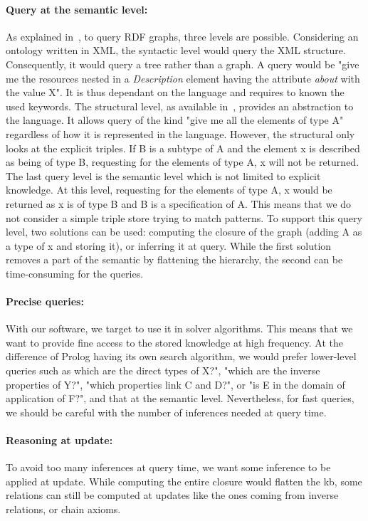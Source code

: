 \paragraph{Query at the semantic level:} As explained in~\cite{broekstra_2002_sesame}, to query RDF graphs, three levels are possible. Considering an ontology written in XML, the syntactic level would query the XML structure. Consequently, it would query a tree rather than a graph. A query would be "give me the resources nested in a \textit{Description} element having the attribute \textit{about} with the value X". It is thus dependant on the language and requires to known the used keywords. The structural level, as available in~\cite{lassila_1998_resource}, provides an abstraction to the language. It allows query of the kind "give me all the elements of type A" regardless of how it is represented in the language. However, the structural only looks at the explicit triples. If B is a subtype of A and the element x is described as being of type B, requesting for the elements of type A, x will not be returned. The last query level is the semantic level which is not limited to explicit knowledge. At this level, requesting for the elements of type A, x would be returned as x is of type B and B is a specification of A. This means that we do not consider a simple triple store trying to match patterns. To support this query level, two solutions can be used: computing the closure of the graph (adding A as a type of x and storing it), or inferring it at query. While the first solution removes a part of the semantic by flattening the hierarchy, the second can be time-consuming for the queries.

\paragraph{Precise queries:} With our software, we target to use it in solver algorithms. This means that we want to provide fine access to the stored knowledge at high frequency. At the difference of Prolog having its own search algorithm, we would prefer lower-level queries such as which are the direct types of X?", "which are the inverse properties of Y?", "which properties link C and D?", or "is E in the domain of application of F?", and that at the semantic level. Nevertheless, for fast queries, we should be careful with the number of inferences needed at query time.

\paragraph{Reasoning at update:} To avoid too many inferences at query time, we want some inference to be applied at update. While computing the entire closure would flatten the \acrshort{kb}, some relations can still be computed at updates like the ones coming from inverse relations, or chain axioms.

